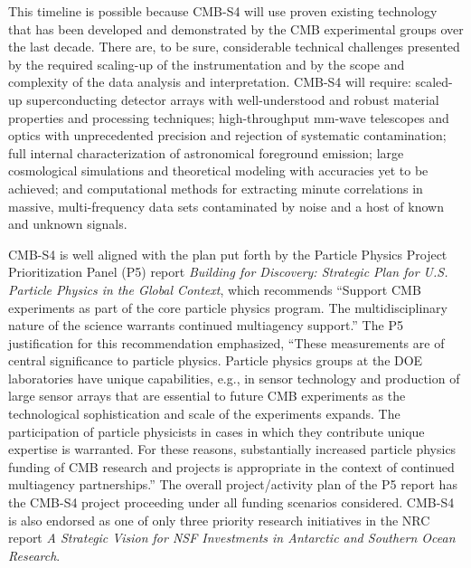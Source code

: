 This timeline is possible because CMB-S4 will use proven existing technology that has been developed and demonstrated by the CMB experimental groups over the last decade. There are, to be sure, considerable technical challenges presented by the required scaling-up of the instrumentation and by the scope and complexity of the data analysis and interpretation.  CMB-S4 will require: scaled-up superconducting detector arrays with well-understood and robust material properties and processing techniques; high-throughput mm-wave telescopes and optics with unprecedented precision and rejection of systematic contamination; full internal characterization of astronomical foreground emission; large cosmological simulations and theoretical modeling with accuracies yet to be achieved; and computational methods for extracting minute correlations in massive, multi-frequency data sets contaminated by noise and a host of known and unknown signals. 


CMB-S4 is well aligned with the plan put forth by the Particle Physics Project Prioritization Panel (P5) report {\it Building for Discovery: Strategic Plan for U.S. Particle Physics in the Global Context}, which recommends ``Support CMB experiments as part of the core particle physics program. The multidisciplinary nature of the science warrants continued multiagency support.''  The P5 justification for this recommendation emphasized, ``These measurements are of central significance to particle physics. Particle physics groups at the DOE laboratories have unique capabilities, e.g., in sensor technology and production of large sensor arrays that are essential to future CMB experiments as the technological sophistication and scale of the experiments expands. The participation of particle physicists in cases in which they contribute unique expertise is warranted. For these reasons, substantially increased particle physics funding of CMB research and projects is appropriate in the context of continued multiagency partnerships.''  The overall project/activity plan of the P5 report has the CMB-S4 project proceeding under all funding scenarios considered.  CMB-S4 is also endorsed as one of only three priority research initiatives in 
the NRC report {\it A Strategic Vision for NSF Investments in Antarctic and Southern Ocean Research}. 

